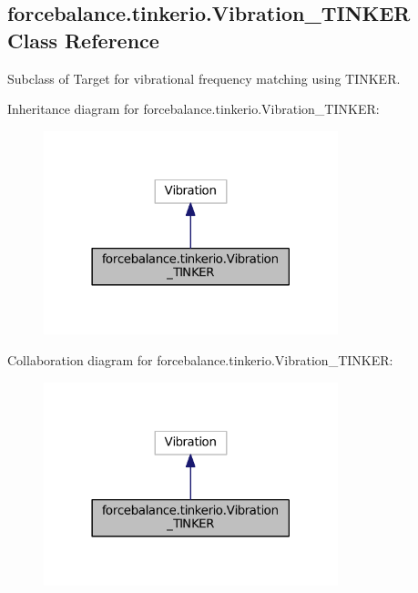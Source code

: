 \hypertarget{classforcebalance_1_1tinkerio_1_1Vibration__TINKER}{\subsection{forcebalance.\-tinkerio.\-Vibration\-\_\-\-T\-I\-N\-K\-E\-R Class Reference}
\label{classforcebalance_1_1tinkerio_1_1Vibration__TINKER}
}


Subclass of Target for vibrational frequency matching using T\-I\-N\-K\-E\-R.  




Inheritance diagram for forcebalance.\-tinkerio.\-Vibration\-\_\-\-T\-I\-N\-K\-E\-R\-:
\nopagebreak
\begin{figure}[H]
\begin{center}
\leavevmode
\includegraphics[width=242pt]{classforcebalance_1_1tinkerio_1_1Vibration__TINKER__inherit__graph}
\end{center}
\end{figure}


Collaboration diagram for forcebalance.\-tinkerio.\-Vibration\-\_\-\-T\-I\-N\-K\-E\-R\-:
\nopagebreak
\begin{figure}[H]
\begin{center}
\leavevmode
\includegraphics[width=242pt]{classforcebalance_1_1tinkerio_1_1Vibration__TINKER__coll__graph}
\end{center}
\end{figure}
